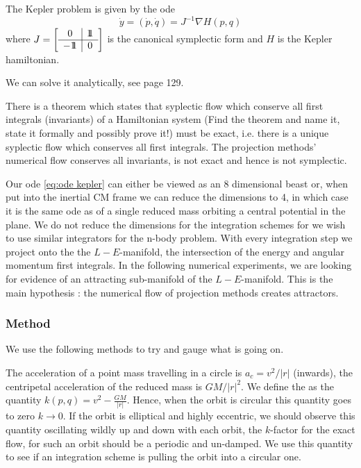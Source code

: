 \documentclass[12pt]{article}
\begin{document}
The Kepler problem is given by the ode
\begin{equation}\label{eq:ode kepler}
    \dot y = (\dot p,\dot q) = J^{-1}\nabla H(p,q)
\end{equation}
where $J = \left[\begin{array}{c|c}0&1\!\!1\\\hline-1\!\!1&0\end{array}\right]$ is the canonical symplectic form and $H$ is the Kepler hamiltonian.

We can solve it analytically, see \cite{WBell} page 129. 

There is a theorem which states that syplectic flow which conserve all first integrals (invariants) of a Hamiltonian system (Find the theorem and name it, state it formally and possibly prove it!) must be exact, i.e. there is a unique syplectic flow which conserves all first integrals. The projection methods' numerical flow conserves all invariants, is not exact and hence is not symplectic. 


Our ode \eqref{eq:ode kepler} can either be viewed as an 8 dimensional beast or, when put into the inertial CM frame we can reduce the dimensions to 4, in which case it is the same ode as of a single reduced mass orbiting a central potential in the plane. We do not reduce the dimensions for the integration schemes for we wish to use similar integrators for the n-body problem. With every integration step we project onto the the $L-E$-manifold, the intersection of the energy and angular momentum first integrals. In the following numerical experiments, we are looking for evidence of an attracting sub-manifold of the $L-E$-manifold. This is the main hypothesis : the numerical flow of projection methods creates attractors.

\subsubsection{Method}

We use the following methods to try and gauge what is going on.

The acceleration of a point mass travelling in a circle is $a_c = v^2/|r|$ (inwards), the centripetal acceleration of the reduced mass is $GM/{|r|^2}$. We define the  as the quantity $k(p,q) = v^2 - \frac{GM}{|r|}$. Hence, when the orbit is circular this quantity goes to zero $k\to 0$. If the orbit is elliptical and highly eccentric, we should observe this quantity oscillating wildly up and down with each orbit, the $k$-factor for the exact flow, for such an orbit should be a periodic and un-damped. We use this quantity to see if an integration scheme is pulling the orbit into a circular one. 
\end{document}
